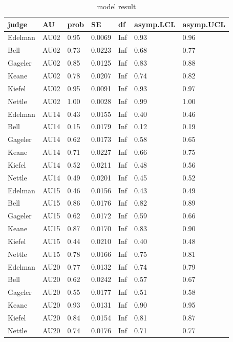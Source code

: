 \documentclass{monashthesis}
\begin{document}
\begin{table}[ht]
\begin{center}
\caption{\label{tab:result_1} model result}
\begin{tabular}{lllllll}
\toprule
judge & AU & prob & SE & df & asymp.LCL & asymp.UCL \\
\midrule
Edelman & AU02 & 0.95 & 0.0069 & Inf & 0.93 & 0.96 \\
Bell & AU02 & 0.73 & 0.0223 & Inf & 0.68 & 0.77 \\
Gageler & AU02 & 0.85 & 0.0125 & Inf & 0.83 & 0.88 \\
Keane & AU02 & 0.78 & 0.0207 & Inf & 0.74 & 0.82 \\
Kiefel & AU02 & 0.95 & 0.0091 & Inf & 0.93 & 0.97 \\
Nettle & AU02 & 1.00 & 0.0028 & Inf & 0.99 & 1.00 \\
Edelman & AU14 & 0.43 & 0.0155 & Inf & 0.40 & 0.46 \\
Bell & AU14 & 0.15 & 0.0179 & Inf & 0.12 & 0.19 \\
Gageler & AU14 & 0.62 & 0.0173 & Inf & 0.58 & 0.65 \\
Keane & AU14 & 0.71 & 0.0227 & Inf & 0.66 & 0.75 \\
Kiefel & AU14 & 0.52 & 0.0211 & Inf & 0.48 & 0.56 \\
Nettle & AU14 & 0.49 & 0.0201 & Inf & 0.45 & 0.52 \\
Edelman & AU15 & 0.46 & 0.0156 & Inf & 0.43 & 0.49 \\
Bell & AU15 & 0.86 & 0.0176 & Inf & 0.82 & 0.89 \\
Gageler & AU15 & 0.62 & 0.0172 & Inf & 0.59 & 0.66 \\
Keane & AU15 & 0.87 & 0.0170 & Inf & 0.83 & 0.90 \\
Kiefel & AU15 & 0.44 & 0.0210 & Inf & 0.40 & 0.48 \\
Nettle & AU15 & 0.78 & 0.0166 & Inf & 0.75 & 0.81 \\
Edelman & AU20 & 0.77 & 0.0132 & Inf & 0.74 & 0.79 \\
Bell & AU20 & 0.62 & 0.0242 & Inf & 0.57 & 0.67 \\
Gageler & AU20 & 0.55 & 0.0177 & Inf & 0.51 & 0.58 \\
Keane & AU20 & 0.93 & 0.0131 & Inf & 0.90 & 0.95 \\
Kiefel & AU20 & 0.84 & 0.0154 & Inf & 0.81 & 0.87 \\
Nettle & AU20 & 0.74 & 0.0176 & Inf & 0.71 & 0.77 \\
\bottomrule
\end{tabular}
\end{center}
\end{table}
\end{document}
